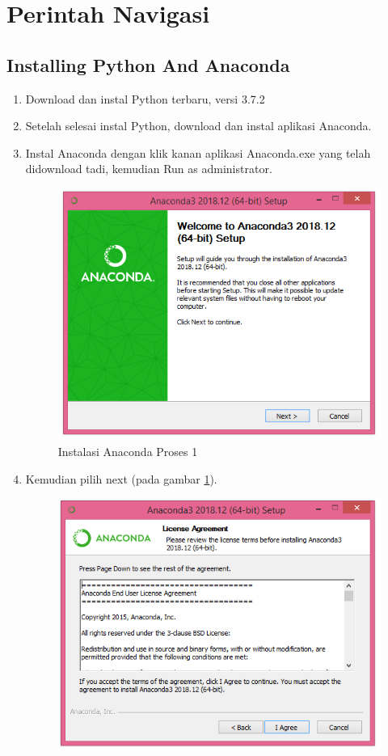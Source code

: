 \section{Perintah Navigasi}

\subsection{Installing Python And Anaconda}
\begin{enumerate}
  \item Download dan instal Python terbaru, versi 3.7.2
  \item Setelah selesai instal Python, download dan instal aplikasi Anaconda.
  \item Instal Anaconda dengan klik kanan aplikasi Anaconda.exe yang telah didownload tadi, kemudian Run as administrator.
      \begin{figure}[!ht]
	  \centering
	  \includegraphics[scale=0.4]{figures/instal/1.PNG}
	  \caption{Instalasi Anaconda Proses 1}
	  \label{labelgambar2}
	  \end{figure}
  \item Kemudian pilih next (pada gambar \ref{labelgambar2}).
	 \begin{figure}[h]
	  \centering
	  \includegraphics[scale=0.4]{figures/instal/2.PNG}

\end{figure}
\end{enumerate}

